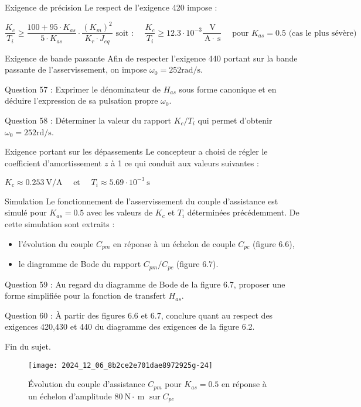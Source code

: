Exigence de précision Le respect de l'exigence 420 impose :

$
\dfrac{K_{c}}{T_{i}} \geq \dfrac{100+95 \cdot K_{a s}}{5 \cdot K_{a s}} \cdot \dfrac{\left(K_{m}\right)^{2}}{K_{r} \cdot J_{e q}} \text { soit : } \quad \dfrac{K_{c}}{T_{i}} \geq 12.3 \cdot 10^{-3} \dfrac{\mathrm{~V}}{\mathrm{~A} \cdot \mathrm{~s}} \quad \text { pour } K_{a s}=0.5 \text { (cas le plus sévère) }
$

Exigence de bande passante Afin de respecter l'exigence 440 portant sur la bande passante de l'asservissement, on impose \(\omega_{0}=252 \mathrm{rad} / \mathrm{s}\).

Question 57 : Exprimer le dénominateur de \(H_{a s}\) sous forme canonique et en déduire l'expression de sa pulsation propre \(\omega_{0}\).

Question 58 : Déterminer la valeur du rapport \(K_{c} / T_{i}\) qui permet d'obtenir \(\omega_{0}=252 \mathrm{rd} / \mathrm{s}\).

Exigence portant sur les dépassements Le concepteur a choisi de régler le coefficient d'amortissement \(z\) à 1 ce qui conduit aux valeurs suivantes :

$
K_{c} \approx 0.253 \mathrm{~V} / \mathrm{A} \quad \text { et } \quad T_{i} \approx 5.69 \cdot 10^{-3} \mathrm{~s}
$

Simulation Le fonctionnement de l'asservissement du couple d'assistance est simulé pour \(K_{a s}=0.5\) avec les valeurs de \(K_{c}\) et \(T_{i}\) déterminées précédemment. De cette simulation sont extraits :

\begin{itemize}
  \item l'évolution du couple \(C_{p m}\) en réponse à un échelon de couple \(C_{p c}\) (figure 6.6),
  \item le diagramme de Bode du rapport \(C_{p m} / C_{p c}\) (figure 6.7).
\end{itemize}

Question 59 : Au regard du diagramme de Bode de la figure 6.7, proposer une forme simplifiée pour la fonction de transfert \(H_{a s}\).

Question 60 : À partir des figures 6.6 et 6.7, conclure quant au respect des exigences 420,430 et 440 du diagramme des exigences de la figure 6.2.

Fin du sujet.\\

\begin{figure}[!htb]
\begin{center}
\texttt{[image: 2024\_12\_06\_8b2ce2e701dae8972925g-24]}
\caption{Évolution du couple d'assistance \(C_{p m}\) pour \(K_{a s}=0.5\) en réponse à un échelon d'amplitude \(80 \mathrm{~N} \cdot \mathrm{~m}\) \(\operatorname{sur} C_{p c}\)\\ \label{fig19}}
\end{center}
\end{figure}

